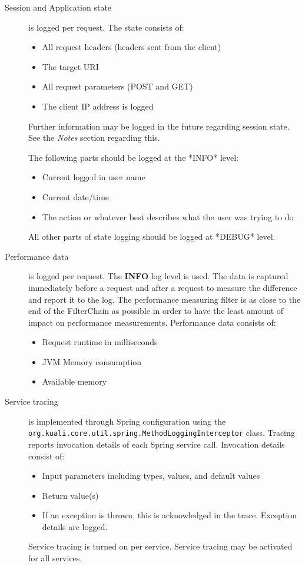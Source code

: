 \documentclass[12pt]{report}
\begin{document}
\begin{description}
\item [Session and Application state] is logged per request. The state consists of:
\begin{itemize}
  \item All request headers (headers sent from the client)
  \item The target URI
  \item All request parameters (POST and GET)
  \item The client IP address is logged
\end{itemize}
Further information may be logged in the future regarding session state. See the \emph{Notes} section regarding 
this.

The following parts should be logged at the *INFO* level:
\begin{itemize}
  \item Current logged in user name
  \item Current date/time
  \item The action or whatever best describes what the user was trying to do
\end{itemize}

All other parts of state logging should be logged at *DEBUG* level.

\item [Performance data] is logged per request. The \textbf{INFO} log level is used. The data is captured immediately before a request and after a request to measure the difference
and report it to the log. The performance measuring filter is as close to the end of the FilterChain as possible in order to have
the least amount of impact on performance measurements. Performance data consists of:
\begin{itemize}
  \item Request runtime in milliseconds
  \item JVM Memory consumption
  \item Available memory
\end{itemize}

\item [Service tracing] is implemented through Spring configuration using the \verb|org.kuali.core.util.spring.MethodLoggingInterceptor|
class. Tracing reports invocation details of each Spring service call. Invocation details consist of:
\begin{itemize}
  \item Input parameters including types, values, and default values
  \item Return value(s)
  \item If an exception is thrown, this is acknowledged in the trace. Exception details are logged.
\end{itemize}

Service tracing is turned on per service. Service tracing may be activated for all services.
\end{description}
\end{document}
